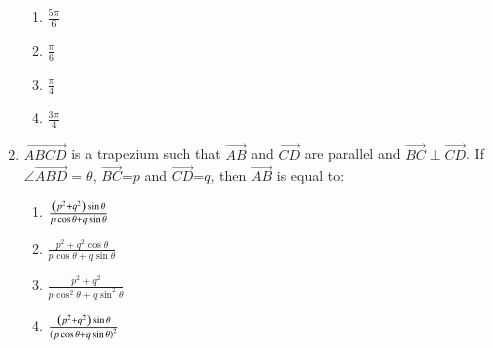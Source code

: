\documentclass[journal,12pt,twocolumn]{IEEEtran}
\theoremstyle{remark}
\begin{document}
\begin{enumerate}
\hfill{}
\begin{multicols}{4}
\begin{enumerate}
\item $\frac{5\pi}{6}$
\columnbreak
\item $\frac{\pi}{6}$
\columnbreak
\item $\frac{\pi}{4}$
\columnbreak
\item $\frac{3\pi}{4}$
\end{enumerate} 
\end{multicols}
\item $\vec{ABCD}$ is a trapezium such that $\vec{AB}$ and $\vec{CD}$ are parallel and $\vec{BC}\perp\vec{CD}$. If $\angle\vec{ABD}=\theta$, $\vec{BC}$=$p$ and $\vec{CD}$=$q$, then $\vec{AB}$ is equal to:
\hfill{}
\begin{multicols}{2} 
\begin{enumerate}
\item $\frac{\left(p^2+q^2\right)\sin\theta}{p\cos\theta+q\sin\theta}$
\item $\frac{p^2+q^2\cos\theta}{p\cos\theta+q\sin\theta}$
\columnbreak
\item $\frac{p^2+q^2}{p\cos^2 \theta+q\sin^2 \theta}$
\item $\frac{\left(p^2+q^2\right)\sin\theta}{\left(p\cos\theta+q\sin\theta\right)^2}$
\end{enumerate}
\end{multicols}
\end{enumerate}
\end{document}

